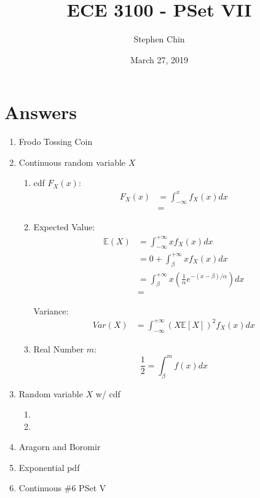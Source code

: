 \documentclass{article}
\title{ECE 3100 - PSet VII}
\author{Stephen Chin}
\date{March 27, 2019}
\begin{document}
\maketitle

\section{Answers}

\begin{enumerate}
\item Frodo Tossing Coin %

\item Continuous random variable $X$ %
  \begin{enumerate}
  \item %
    cdf $F_X(x)$:
    \[
      \begin{aligned}
        F_X(x)
        &= \int_{-\infty}^{x} f_X(x) dx \\
        &= 
      \end{aligned}
    \]

  \item %
    Expected Value:
    \[
      \begin{aligned}
        \mathbb{E}(X)
        &= \int_{-\infty}^{+\infty} x f_X(x) dx \\
        &= 0 + \int_{\beta}^{+\infty} x f_X(x) dx \\
        &= \int_{\beta}^{+\infty} x(\frac{1}{\alpha} e^{-(x-\beta) / \alpha}) dx \\
        &= 
      \end{aligned}
    \]

    Variance:
    \[
      \begin{aligned}
        Var(X)
        &= \int_{-\infty}^{+\infty} (X \mathbb{E}[X])^2 f_X(x) dx
      \end{aligned}
    \]

  \item %
    Real Number $m$:
    \[
      \frac{1}{2} = \int_\beta^m f(x) dx
    \]
    
  \end{enumerate}

\item Random variable $X$ w/ cdf %
  \begin{enumerate}
  \item %
    
  \item %
    
  \end{enumerate}

\item Aragorn and Boromir %

\item Exponential pdf %

\item Continuous \#6 PSet V %


\end{enumerate}
\end{document}
